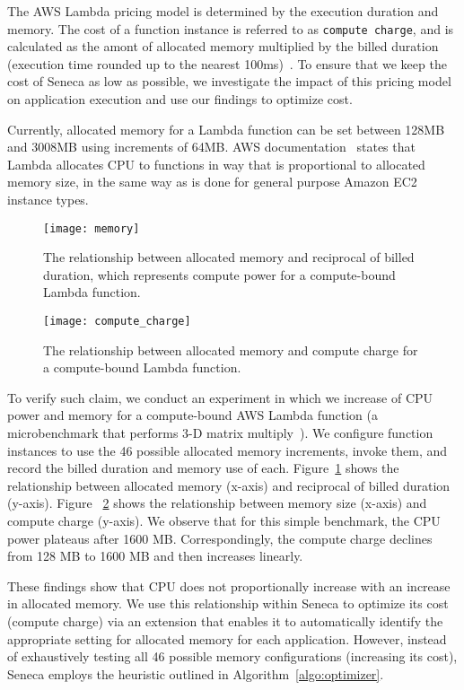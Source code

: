 The AWS Lambda pricing model is determined by the execution duration 
and memory. The cost of a function instance is referred to as 
\texttt{compute charge}, and is calculated as the amont of 
allocated memory multiplied by the
billed duration (execution time rounded up to the 
nearest 100ms)~\cite{ref:pricing}.
To ensure that we keep the cost of Seneca as low as possible, we investigate
the impact of this pricing model on application execution and use
our findings to optimize cost.

Currently, allocated memory for a Lambda function can be set
between 128MB and 3008MB using increments of 64MB.
AWS documentation~\cite{ref:lambdalimits} states that Lambda 
allocates CPU to functions in way that is proportional to allocated memory size,
in the same way as is done for general purpose Amazon EC2 instance types.

\begin{figure}[t] \centering 
\texttt{[image: memory]}
\caption{The relationship between allocated memory and reciprocal of billed duration, which represents compute power for a compute-bound Lambda function.
\label{fig:memory}}
\end{figure}

\begin{figure}[t] \centering 
\texttt{[image: compute\_charge]}
\caption{The relationship between allocated memory and compute charge for a compute-bound Lambda function.
\label{fig:compute_charge}}
\end{figure}


To verify such claim, we conduct an experiment in which
we increase of CPU power and memory for a compute-bound 
AWS Lambda function (a microbenchmark that performs 3-D matrix multiply~\cite{ref:matrix}).
We configure function instances to use the 46 possible allocated 
memory increments, invoke them, and record the billed duration and memory
use of each.
Figure~\ref{fig:memory} shows the relationship between allocated memory (x-axis) and reciprocal of billed duration (y-axis). 
Figure ~\ref{fig:compute_charge} shows the relationship between memory 
size (x-axis) and compute charge (y-axis). 
We observe that for this simple benchmark,
the CPU power plateaus after 1600 MB. 
Correspondingly, the compute charge declines from 128 MB to 1600 MB 
and then increases linearly. 


These findings show that CPU does not proportionally increase with
an increase in allocated memory.  We use this relationship within
Seneca to optimize its cost (compute charge) via an extension
that enables it to automatically identify the appropriate
setting for allocated memory for each application.
However, instead of exhaustively testing all 46 possible 
memory configurations (increasing its cost), 
Seneca employs the heuristic outlined in
Algorithm~\ref{algo:optimizer}. 

